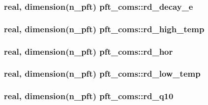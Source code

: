 \subsubsection[{rd\+\_\+decay\+\_\+e}]{\setlength{\rightskip}{0pt plus 5cm}real, dimension(n\+\_\+pft) pft\+\_\+coms\+::rd\+\_\+decay\+\_\+e}\label{namespacepft__coms_abc5e92f122fd2ebab52069105e512fa5}
\hypertarget{namespacepft__coms_a1bcf4f8ef5012e5ea47b2e5deb6dae4a}{}
\subsubsection[{rd\+\_\+high\+\_\+temp}]{\setlength{\rightskip}{0pt plus 5cm}real, dimension(n\+\_\+pft) pft\+\_\+coms\+::rd\+\_\+high\+\_\+temp}\label{namespacepft__coms_a1bcf4f8ef5012e5ea47b2e5deb6dae4a}
\hypertarget{namespacepft__coms_aa082b314a2092d3ee2b63f30cd1fc8be}{}
\subsubsection[{rd\+\_\+hor}]{\setlength{\rightskip}{0pt plus 5cm}real, dimension(n\+\_\+pft) pft\+\_\+coms\+::rd\+\_\+hor}\label{namespacepft__coms_aa082b314a2092d3ee2b63f30cd1fc8be}
\hypertarget{namespacepft__coms_ad26dff15166122932a2a576c592451ba}{}
\subsubsection[{rd\+\_\+low\+\_\+temp}]{\setlength{\rightskip}{0pt plus 5cm}real, dimension(n\+\_\+pft) pft\+\_\+coms\+::rd\+\_\+low\+\_\+temp}\label{namespacepft__coms_ad26dff15166122932a2a576c592451ba}
\hypertarget{namespacepft__coms_ac49f4aa4c8e6b1ab0c02f40ac0c443bd}{}
\subsubsection[{rd\+\_\+q10}]{\setlength{\rightskip}{0pt plus 5cm}real, dimension(n\+\_\+pft) pft\+\_\+coms\+::rd\+\_\+q10}\label{namespacepft__coms_ac49f4aa4c8e6b1ab0c02f40ac0c443bd}
\hypertarget{namespacepft__coms_a30fe0a0ce90033d81e78cc82c9b70017}{}
